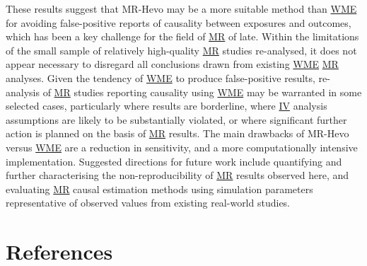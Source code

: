 \documentclass[
]{article}
\begin{document}
These results suggest that MR-Hevo may be a more suitable method than \hyperref[acronyms_WME]{WME} for avoiding false-positive reports of causality between exposures and outcomes, which has been a key challenge for the field of \hyperref[acronyms_MR]{MR} of late. Within the limitations of the small sample of relatively high-quality \hyperref[acronyms_MR]{MR} studies re-analysed, it does not appear necessary to disregard all conclusions drawn from existing \hyperref[acronyms_WME]{WME} \hyperref[acronyms_MR]{MR} analyses. Given the tendency of \hyperref[acronyms_WME]{WME} to produce false-positive results, re-analysis of \hyperref[acronyms_MR]{MR} studies reporting causality using \hyperref[acronyms_WME]{WME} may be warranted in some selected cases, particularly where results are borderline, where \hyperref[acronyms_IV]{IV} analysis assumptions are likely to be substantially violated, or where significant further action is planned on the basis of \hyperref[acronyms_MR]{MR} results. The main drawbacks of MR-Hevo versus \hyperref[acronyms_WME]{WME} are a reduction in sensitivity, and a more computationally intensive implementation. Suggested directions for future work include quantifying and further characterising the non-reproducibility of \hyperref[acronyms_MR]{MR} results observed here, and evaluating \hyperref[acronyms_MR]{MR} causal estimation methods using simulation parameters representative of observed values from existing real-world studies.

\newpage

\section{References}\label{references}
\end{document}
